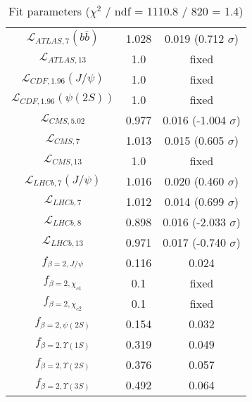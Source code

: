 \begin{table}[h!]
\begin{tabular}{c|c|c}
$\mathcal L_{ATLAS,7}(b\overline b)$ & 1.028 & 0.019 (0.712 $\sigma$) \\
$\mathcal L_{ATLAS,13}$ & 1.0 & fixed \\
$\mathcal L_{CDF,1.96}(J/\psi)$ & 1.0 & fixed \\
$\mathcal L_{CDF,1.96}(\psi(2S))$ & 1.0 & fixed \\
$\mathcal L_{CMS,5.02}$ & 0.977 & 0.016 (-1.004 $\sigma$) \\
$\mathcal L_{CMS,7}$ & 1.013 & 0.015 (0.605 $\sigma$) \\
$\mathcal L_{CMS,13}$ & 1.0 & fixed \\
$\mathcal L_{LHCb,7}(J/\psi)$ & 1.016 & 0.020 (0.460 $\sigma$) \\
$\mathcal L_{LHCb,7}$ & 1.012 & 0.014 (0.699 $\sigma$) \\
$\mathcal L_{LHCb,8}$ & 0.898 & 0.016 (-2.033 $\sigma$) \\
$\mathcal L_{LHCb,13}$ & 0.971 & 0.017 (-0.740 $\sigma$) \\
$f_{\beta=2,J/\psi}$ & 0.116 & 0.024 \\
$f_{\beta=2,\chi_{c1}}$ & 0.1 & fixed \\
$f_{\beta=2,\chi_{c2}}$ & 0.1 & fixed \\
$f_{\beta=2,\psi(2S)}$ & 0.154 & 0.032 \\
$f_{\beta=2,\Upsilon(1S)}$ & 0.319 & 0.049 \\
$f_{\beta=2,\Upsilon(2S)}$ & 0.376 & 0.057 \\
$f_{\beta=2,\Upsilon(3S)}$ & 0.492 & 0.064 \\
\end{tabular}
\caption{Fit parameters ($\chi^2$ / ndf = 1110.8 / 820 = 1.4)}
\end{table}
